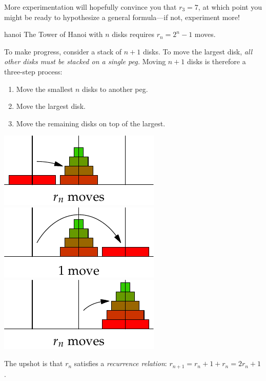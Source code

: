 More experimentation will hopefully convince you that $r_3=7$, at which point you might be ready to hypothesize a general formula---if not, experiment more!

\begin{conj}{}{hanoi}
	The Tower of Hanoi with $n$ disks requires $r_n=2^n-1$ moves.
\end{conj}

To make progress, consider a stack of $n+1$ disks. To move the largest disk, \emph{all other disks must be stacked on a single peg.} Moving $n+1$ disks is therefore a three-step process:
\begin{enumerate}\itemsep0pt
  \item Move the smallest $n$ disks to another peg.
  \item Move the largest disk.
  \item Move the remaining disks on top of the largest.
\end{enumerate}
\begin{center}
\href{http://www.math.uci.edu/~ndonalds/math13/hanoi.html}{
	\includegraphics{induction-04-hanoirn3}\quad
	\includegraphics{induction-04-hanoirn4}\quad
	\includegraphics{induction-04-hanoirn5}
}
\end{center}


The upshot is that $r_n$ satisfies a \emph{recurrence relation}: $r_{n+1}=r_n+1+r_n=2r_n+1$.

